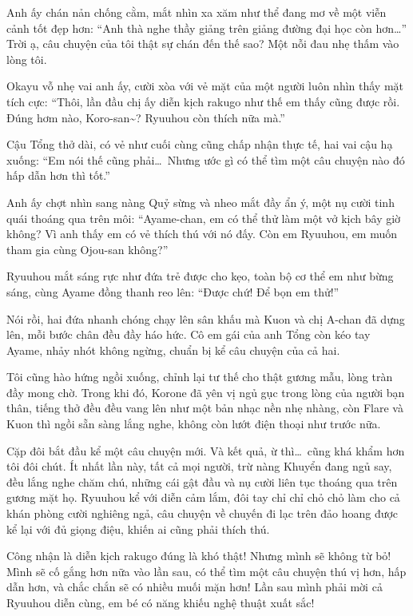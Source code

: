 \documentclass[../main.tex]{subfiles}
\begin{document}
Anh ấy chán nản chống cằm, mắt nhìn xa xăm như thể đang mơ về một viễn cảnh tốt đẹp hơn: ``Anh thà nghe thầy giảng trên giảng đường đại học còn hơn\dots'' Trời ạ, câu chuyện của tôi thật sự chán đến thế sao? Một nỗi đau nhẹ thấm vào lòng tôi.

Okayu vỗ nhẹ vai anh ấy, cười xòa với vẻ mặt của một người luôn nhìn thấy mặt tích cực: ``Thôi, lần đầu chị ấy diễn kịch rakugo như thế em thấy cũng được rồi. Đúng hơm nào, Koro-san\~{}? Ryuuhou còn thích nữa mà.''

Cậu Tổng thở dài, có vẻ như cuối cùng cũng chấp nhận thực tế, hai vai cậu hạ xuống: ``Em nói thế cũng phải\dots\ Nhưng ước gì có thể tìm một câu chuyện nào đó hấp dẫn hơn thì tốt.''

Anh ấy chợt nhìn sang nàng Quỷ sừng và nheo mắt đầy ẩn ý, một nụ cười tinh quái thoáng qua trên môi: ``Ayame-chan, em có thể thử làm một vở kịch bây giờ không? Vì anh thấy em có vẻ thích thú với nó đấy. Còn em Ryuuhou, em muốn tham gia cùng Ojou-san không?''

Ryuuhou mắt sáng rực như đứa trẻ được cho kẹo, toàn bộ cơ thể em như bừng sáng, cùng Ayame đồng thanh reo lên: ``Được chứ! Để bọn em thử!''

Nói rồi, hai đứa nhanh chóng chạy lên sân khấu mà Kuon và chị A-chan đã dựng lên, mỗi bước chân đều đầy háo hức. Cô em gái của anh Tổng còn kéo tay Ayame, nhảy nhót không ngừng, chuẩn bị kể câu chuyện của cả hai.

Tôi cũng hào hứng ngồi xuống, chỉnh lại tư thế cho thật gương mẫu, lòng tràn đầy mong chờ. Trong khi đó, Korone đã yên vị ngủ gục trong lòng của người bạn thân, tiếng thở đều đều vang lên như một bản nhạc nền nhẹ nhàng, còn Flare và Kuon thì ngồi sẵn sàng lắng nghe, không còn lướt điện thoại như trước nữa.

Cặp đôi bắt đầu kể một câu chuyện mới. Và kết quả, ừ thì\dots\ cũng khá khẩm hơn tôi đôi chút. Ít nhất lần này, tất cả mọi người, trừ nàng Khuyển đang ngủ say, đều lắng nghe chăm chú, những cái gật đầu và nụ cười liên tục thoáng qua trên gương mặt họ. Ryuuhou kể với diễn cảm lắm, đôi tay chỉ chỉ chỏ chỏ làm cho cả khán phòng cười nghiêng ngả, câu chuyện về chuyến đi lạc trên đảo hoang được kể lại với đủ giọng điệu, khiến ai cũng phải thích thú.

Công nhận là diễn kịch rakugo đúng là khó thật! Nhưng mình sẽ không từ bỏ! Mình sẽ cố gắng hơn nữa vào lần sau, có thể tìm một câu chuyện thú vị hơn, hấp dẫn hơn, và chắc chắn sẽ có nhiều muối mặn hơn! Lần sau mình phải mời cả Ryuuhou diễn cùng, em bé có năng khiếu nghệ thuật xuất sắc!
\end{document}
